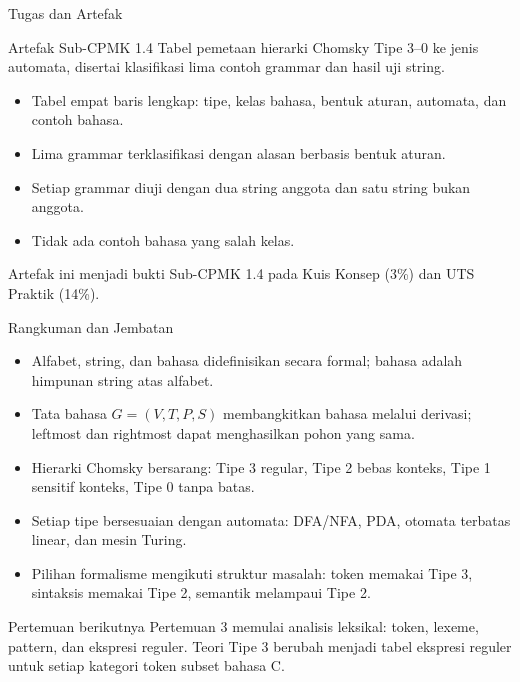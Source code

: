 \documentclass[aspectratio=169,10pt,t]{beamer}
\begin{document}
\begin{frame}{Tugas dan Artefak}
  \begin{block}{Artefak Sub-CPMK 1.4}
    Tabel pemetaan hierarki Chomsky Tipe 3--0 ke jenis automata,
    disertai klasifikasi lima contoh grammar dan hasil uji string.
  \end{block}

  \small
  \begin{itemize}
    \item Tabel empat baris lengkap: tipe, kelas bahasa, bentuk aturan,
          automata, dan contoh bahasa.
    \item Lima grammar terklasifikasi dengan alasan berbasis bentuk
          aturan.
    \item Setiap grammar diuji dengan dua string anggota dan satu string
          bukan anggota.
    \item Tidak ada contoh bahasa yang salah kelas.
  \end{itemize}

  \vspace{3pt}
  {\footnotesize\color{ubbblue!75}Artefak ini menjadi bukti Sub-CPMK 1.4
  pada Kuis Konsep (3\%) dan UTS Praktik (14\%).}
\end{frame}

\begin{frame}{Rangkuman dan Jembatan}
  \begin{itemize}
    \item Alfabet, string, dan bahasa didefinisikan secara formal;
          bahasa adalah himpunan string atas alfabet.
    \item Tata bahasa \(G=(V,T,P,S)\) membangkitkan bahasa melalui
          derivasi; leftmost dan rightmost dapat menghasilkan pohon
          yang sama.
    \item Hierarki Chomsky bersarang: Tipe 3 regular, Tipe 2 bebas
          konteks, Tipe 1 sensitif konteks, Tipe 0 tanpa batas.
    \item Setiap tipe bersesuaian dengan automata: DFA/NFA, PDA,
          otomata terbatas linear, dan mesin Turing.
    \item Pilihan formalisme mengikuti struktur masalah: token memakai
          Tipe 3, sintaksis memakai Tipe 2, semantik melampaui Tipe 2.
  \end{itemize}

  \vspace{4pt}
  \begin{exampleblock}{Pertemuan berikutnya}
    Pertemuan 3 memulai analisis leksikal: token, lexeme, pattern, dan
    ekspresi reguler. Teori Tipe 3 berubah menjadi tabel ekspresi
    reguler untuk setiap kategori token subset bahasa C.
  \end{exampleblock}
\end{frame}
\end{document}
